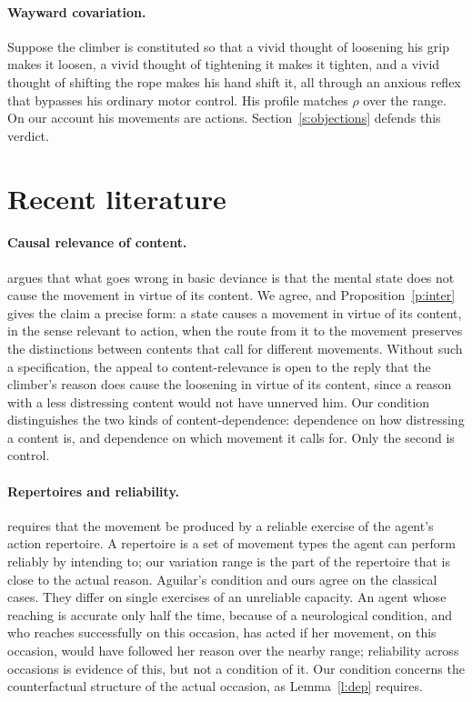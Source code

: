 \documentclass{situationist-preprint}
\begin{document}
\paragraph{Wayward covariation.} Suppose the climber is constituted so that a vivid thought of loosening his grip makes it loosen, a vivid thought of tightening it makes it tighten, and a vivid thought of shifting the rope makes his hand shift it, all through an anxious reflex that bypasses his ordinary motor control. His profile matches $\rho$ over the range. On our account his movements are actions. Section~\ref{s:objections} defends this verdict.

\section{Recent literature}\label{s:recent}

\paragraph{Causal relevance of content.} \citet{Schlosser2007} argues that what goes wrong in basic deviance is that the mental state does not cause the movement in virtue of its content. We agree, and Proposition~\ref{p:inter} gives the claim a precise form: a state causes a movement in virtue of its content, in the sense relevant to action, when the route from it to the movement preserves the distinctions between contents that call for different movements. Without such a specification, the appeal to content-relevance is open to the reply that the climber's reason does cause the loosening in virtue of its content, since a reason with a less distressing content would not have unnerved him. Our condition distinguishes the two kinds of content-dependence: dependence on how distressing a content is, and dependence on which movement it calls for. Only the second is control.

\paragraph{Repertoires and reliability.} \citet{Aguilar2012} requires that the movement be produced by a reliable exercise of the agent's action repertoire. A repertoire is a set of movement types the agent can perform reliably by intending to; our variation range is the part of the repertoire that is close to the actual reason. Aguilar's condition and ours agree on the classical cases. They differ on single exercises of an unreliable capacity. An agent whose reaching is accurate only half the time, because of a neurological condition, and who reaches successfully on this occasion, has acted if her movement, on this occasion, would have followed her reason over the nearby range; reliability across occasions is evidence of this, but not a condition of it. Our condition concerns the counterfactual structure of the actual occasion, as Lemma~\ref{l:dep} requires.
\end{document}
